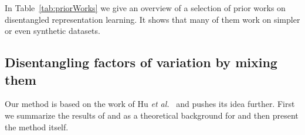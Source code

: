 \documentclass[a4paper,12pt]{report}
\begin{document}
\vspace{5mm}
In Table~\ref{tab:priorWorks} we give an overview of a selection of prior works on disentangled representation learning. It shows that many of them work on simpler or even synthetic datasets.
\begin{table} [H]
\centering
{}
\caption[Overview and characteristics of prior works.]{Overview and characteristics of prior works on disentangled representation learning. (LT) learning type, (us) unsupervised, (ss) semi-supervised, (sv) supervised.} \label{tab:priorWorks}
\end{table}


\subsection{Disentangling factors of variation by mixing them}
Our method is based on the work of Hu \textit{et al.}~\cite{DisentFacOfVarByMixTh} and pushes its idea further. First we summarize the results of \cite{ChallengInDisentIFoF} and \cite{UnderstDegenAndAmbInAT} as a theoretical background for \cite{DisentFacOfVarByMixTh} and then present the method itself. 
\end{document}
